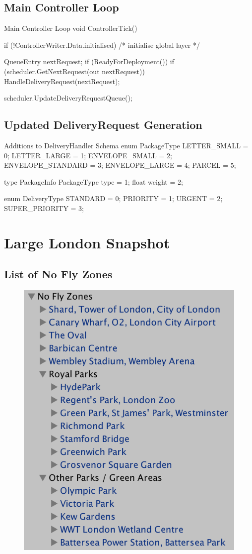 \documentclass[a4paper,11pt,titlepage]{report}
\begin{document}
\begin{appendices}
\section{Main Controller Loop}
\begin{sexylisting}[colback=white]{Main Controller Loop}
void ControllerTick()
{
  if (!ControllerWriter.Data.initialised)
  {
    /* initialise global layer */
  }

  QueueEntry nextRequest;
  if (ReadyForDeployment())
  {
    if (scheduler.GetNextRequest(out nextRequest))
    {
      HandleDeliveryRequest(nextRequest);
    }
  }

  scheduler.UpdateDeliveryRequestQueue();
}
\end{sexylisting}

\section{Updated DeliveryRequest Generation}
\begin{sexylisting}[colback=white]{Additions to DeliveryHandler Schema}
enum PackageType {
  LETTER_SMALL = 0;
  LETTER_LARGE = 1;
  ENVELOPE_SMALL = 2;
  ENVELOPE_STANDARD = 3;
  ENVELOPE_LARGE = 4;
  PARCEL = 5;
}

type PackageInfo {
  PackageType type = 1;
  float weight = 2;
}

enum DeliveryType {
  STANDARD = 0;
  PRIORITY = 1;
  URGENT = 2;
  SUPER_PRIORITY = 3;
}
\end{sexylisting}

\chapter{Large London Snapshot}
\section{List of No Fly Zones}
\begin{figure}[!hbpt]
  \center
  \includegraphics[width=0.7\linewidth]{img/listofnfzlocations.png}
\end{figure}


\end{appendices}
\end{document}
